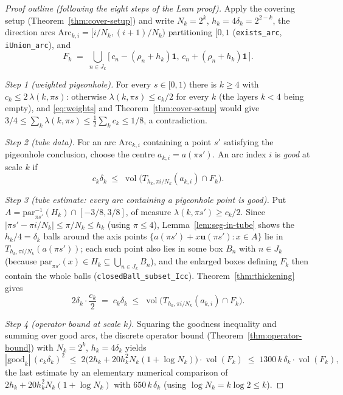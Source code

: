 \documentclass[11pt,a4paper]{article}
\newcommand{\vol}{\operatorname{vol}}                %
\newcommand{\dir}{\mathbf{u}}                        %
\newcommand{\tube}{T}                                %
\newcommand{\lname}[1]{\texttt{#1}}                  %
\theoremstyle{definition}
\theoremstyle{remark}
\begin{document}
\begin{proof}[Proof outline (following the eight steps of the Lean proof)]
Apply the covering setup (Theorem~\ref{thm:cover-setup}) and write
$N_k=2^k$, $h_k=4\delta_k = 2^{2-k}$, the direction arcs
$\mathrm{Arc}_{k,i}=[i/N_k,(i+1)/N_k)$ partitioning $[0,1$
(\lname{exists\_arc}, \lname{iUnion\_arc}), and
\[
  F_k \;=\; \bigcup_{n\in J_k}
        \bigl[\,c_n-(\rho_n+h_k)\mathbf{1},\,c_n+(\rho_n+h_k)\mathbf{1}\,\bigr].
\]

\medskip\noindent\emph{Step 1 (weighted pigeonhole).}
For every $s\in[0,1)$ there is $k\ge4$ with $c_k\le 2\,\lambda(k,\pi s)$: otherwise
$\lambda(k,\pi s)\le c_k/2$ for every $k$ (the layers $k<4$ being empty), and
\eqref{eq:weights} and Theorem~\ref{thm:cover-setup} would give
$3/4\le \sum_k\lambda(k,\pi s)\le \tfrac12\sum_k c_k\le 1/8$, a contradiction.

\medskip\noindent\emph{Step 2 (tube data).}
For an arc $\mathrm{Arc}_{k,i}$ containing a point $s'$ satisfying the pigeonhole
conclusion, choose the centre $a_{k,i}=a(\pi s')$.  An arc index $i$ is \emph{good} at
scale $k$ if
\[
  c_k\delta_k\;\le\; \vol\bigl(\tube_{h_k,\pi i/N_k}(a_{k,i})\cap F_k\bigr).
\]

\medskip\noindent\emph{Step 3 (tube estimate: every arc containing a pigeonhole point is
good).}  Put $A=\mathrm{par}_{\pi s'}^{-1}(H_k)\cap[-3/8,3/8]$, of measure
$\lambda(k,\pi s')\ge c_k/2$.  Since $|\pi s'-\pi i/N_k|\le \pi/N_k\le h_k$
(using $\pi\le 4$), Lemma~\ref{lem:seg-in-tube} shows the $h_k/4=\delta_k$ balls around
the axis points $\{a(\pi s')+x\dir(\pi s'):x\in A\}$ lie in
$\tube_{h_k,\pi i/N_k}(a(\pi s'))$; each such point also lies in some box $B_n$ with
$n\in J_k$ (because $\mathrm{par}_{\pi s'}(x)\in H_k\subseteq\bigcup_{n\in J_k}B_n$), and
the enlarged boxes defining $F_k$ then contain the whole balls
(\lname{closedBall\_subset\_Icc}).  Theorem~\ref{thm:thickening} gives
\[
  2\delta_k\cdot\frac{c_k}{2}
  \;=\; c_k\delta_k
  \;\le\; \vol\bigl(\tube_{h_k,\pi i/N_k}(a_{k,i})\cap F_k\bigr).
\]

\medskip\noindent\emph{Step 4 (operator bound at scale $k$).}
Squaring the goodness inequality and summing over good arcs, the discrete operator bound
(Theorem~\ref{thm:operator-bound}) with $N_k=2^k$, $h_k=4\delta_k$ yields
\[
  |\mathrm{good}_k|\,(c_k\delta_k)^{2}
  \;\le\; 2\bigl(2h_k+20h_k^2N_k(1+\log N_k)\bigr)\cdot\vol(F_k)
  \;\le\; 1300\,k\,\delta_k\cdot\vol(F_k),
\]
the last estimate by an elementary numerical comparison of
$2h_k+20h_k^2N_k(1+\log N_k)$ with $650\,k\,\delta_k$ (using $\log N_k = k\log 2\le k$).


\end{proof}
\end{document}

